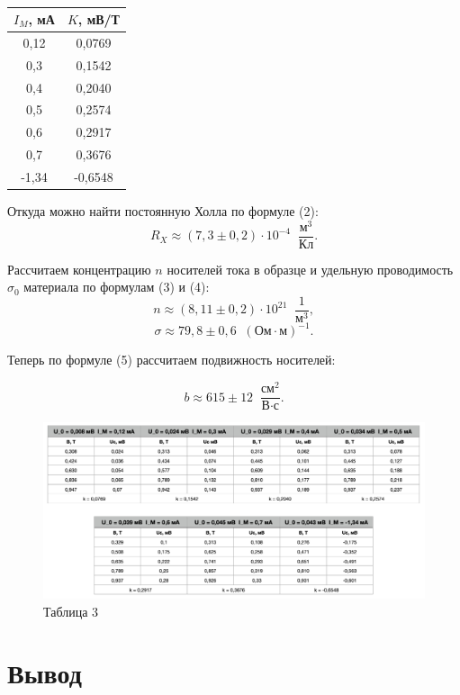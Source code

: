 \documentclass[a4paper]{article}
\theoremstyle{definition}
\theoremstyle{remark}
\begin{document}
        \begin{table}[h!]
            \caption{}
            \centering
            \begin{tabular}{|c|c|}
            \hline
            \multicolumn{1}{|l|}{{$I_M$, мА}} & \multicolumn{1}{l|}{{$K$, мВ/Т}}\\ \hline
            0,12 & 0,0769 \\ \hline
            0,3 & 0,1542 \\ \hline
            0,4 & 0,2040 \\ \hline
            0,5 & 0,2574 \\ \hline
            0,6 & 0,2917 \\ \hline
            0,7 & 0,3676 \\ \hline
            -1,34 & -0,6548 \\ \hline
            \end{tabular}
            \end{table}

    Откуда можно найти постоянную Холла по формуле (2): $$R_{X} \approx (7,3 \pm 0,2)\cdot 10^{-4} \;\;\frac{\text{м}^3}{\text{Кл}}.$$

    Рассчитаем концентрацию $n$ носителей тока в образце и удельную проводимость $\sigma_0$ материала по формулам (3) и (4): $$n \approx (8,11 \pm 0,2) \cdot 10^{21} \;\;\frac{1}{\text{м}^3},$$ $$\sigma \approx 79, 8 \pm 0,6 \;\;(\text{Ом}\cdot\text{м})^{-1}.$$

    Теперь по формуле (5) рассчитаем подвижность носителей:

    $$b \approx 615 \pm 12 \;\;\frac{\text{см}^2}{\text{В}\cdot\text{с}}.$$

    \begin{figure}[h!]
        \caption*{Таблица 3}
        \centering
        \includegraphics[width = 370pt]{image/table3.png}
    \end{figure}

    \section{Вывод}
\end{document}
